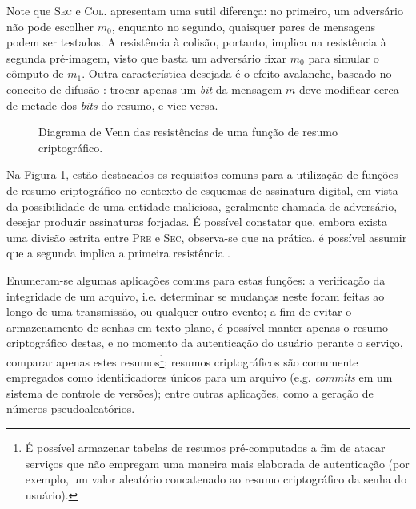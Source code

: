 \documentclass[12pt]{report}
\def\precircle{(0.00, 0) circle (1.25cm)}
\def\seccircle{(1.75, 0) circle (1.25cm)}
\def\colcircle{(1.75, 0) circle (0.75cm)}
\begin{document}
Note que \textsc{Sec} e \textsc{Col}. apresentam uma sutil diferença: no
primeiro, um adversário não pode escolher $m_0$, enquanto no segundo, quaisquer
pares de mensagens podem ser testados. A resistência à colisão, portanto,
implica na resistência à segunda pré-imagem, visto que basta um adversário
fixar $m_0$ para simular o cômputo de $m_1$. Outra característica desejada é o
efeito avalanche, baseado no conceito de difusão
\cite{Stallings:2010:CNS:1824151}: trocar apenas um \emph{bit} da mensagem $m$
deve modificar cerca de metade dos \emph{bits} do resumo, e vice-versa.

\begin{figure}[h]
  \centering
  \caption{Diagrama de Venn das resistências de uma função de resumo
    criptográfico.}
  \label{fig:1}
\end{figure}

Na Figura \ref{fig:1}, estão destacados os requisitos comuns para a utilização
de funções de resumo criptográfico no contexto de esquemas de assinatura
digital, em vista da possibilidade de uma entidade maliciosa, geralmente
chamada de adversário, desejar produzir assinaturas forjadas. É possível
constatar que, embora exista uma divisão estrita entre \textsc{Pre} e
\textsc{Sec}, observa-se que na prática, é possível assumir que a segunda
implica a primeira resistência \cite{Menezes:1996:HAC:548089}.

Enumeram-se algumas aplicações comuns para estas funções: a verificação da
integridade de um arquivo, i.e. determinar se mudanças neste foram feitas ao
longo de uma transmissão, ou qualquer outro evento; a fim de evitar o
armazenamento de senhas em texto plano, é possível manter apenas o resumo
criptográfico destas, e no momento da autenticação do usuário perante o
serviço, comparar apenas estes resumos\footnote{É possível armazenar tabelas de
resumos pré-computados a fim de atacar serviços que não empregam uma maneira
mais elaborada de autenticação (por exemplo, um valor aleatório
concatenado ao resumo criptográfico da senha do usuário).}; resumos
criptográficos são comumente empregados como identificadores únicos para um
arquivo (e.g. \emph{commits} em um sistema de controle de versões); entre
outras aplicações, como a geração de números pseudoaleatórios.
\end{document}
